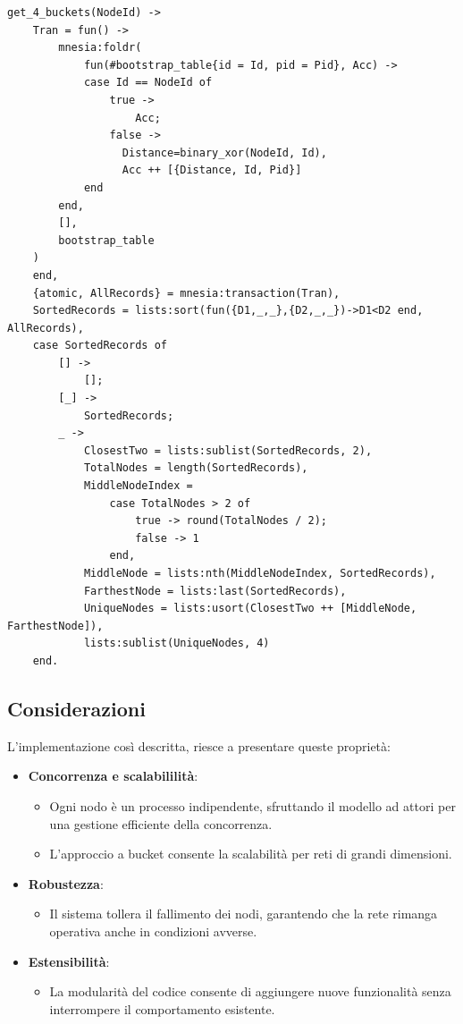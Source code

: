 \documentclass{article}
\begin{document}
\begin{lstlisting}
get_4_buckets(NodeId) ->
    Tran = fun() ->
        mnesia:foldr(
            fun(#bootstrap_table{id = Id, pid = Pid}, Acc) -> 
            case Id == NodeId of
                true ->
                    Acc;
                false ->
                  Distance=binary_xor(NodeId, Id),
                  Acc ++ [{Distance, Id, Pid}]
            end
        end,
        [],
        bootstrap_table
    )
    end,
    {atomic, AllRecords} = mnesia:transaction(Tran),
    SortedRecords = lists:sort(fun({D1,_,_},{D2,_,_})->D1<D2 end, AllRecords),
    case SortedRecords of
        [] ->
            [];
        [_] ->
            SortedRecords;
        _ ->
            ClosestTwo = lists:sublist(SortedRecords, 2),
            TotalNodes = length(SortedRecords),
            MiddleNodeIndex =
                case TotalNodes > 2 of
                    true -> round(TotalNodes / 2);
                    false -> 1
                end,
            MiddleNode = lists:nth(MiddleNodeIndex, SortedRecords),
            FarthestNode = lists:last(SortedRecords),
            UniqueNodes = lists:usort(ClosestTwo ++ [MiddleNode, FarthestNode]),
            lists:sublist(UniqueNodes, 4)
    end.
\end{lstlisting}

\subsection{Considerazioni}
L'implementazione così descritta, riesce a presentare queste proprietà:
\begin{itemize}
    \item \textbf{Concorrenza e scalabililità}:
    \begin{itemize}
        \item Ogni nodo è un processo indipendente, sfruttando il modello ad attori per una gestione efficiente della concorrenza.
        \item L'approccio a bucket consente la scalabilità per reti di grandi dimensioni.
    \end{itemize}
    \item \textbf{Robustezza}:
    \begin{itemize}
        \item Il sistema tollera il fallimento dei nodi, garantendo che la rete rimanga operativa anche in condizioni avverse.
    \end{itemize}
    \item \textbf{Estensibilità}:
    \begin{itemize}
        \item La modularità del codice consente di aggiungere nuove funzionalità senza interrompere il comportamento esistente.
    \end{itemize}
\end{itemize}
\end{document}
